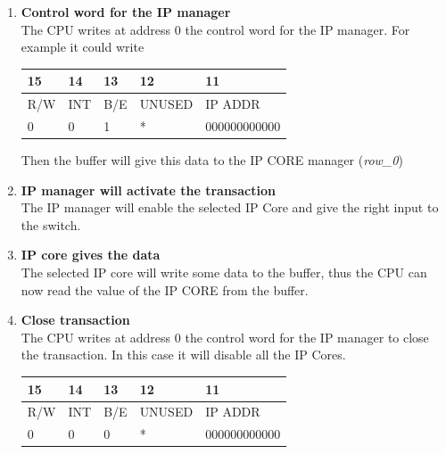 \begin{enumerate}
	\item \textbf{Control word for the IP manager}\\
	 The CPU writes at address 0 the control word for the IP manager.
	 For example it could write
	 
	 \begin{center}
	 	\begin{tabular}{ | l | l |  l | l | l |}
	 		
	 		15 & 14 & 13 & 12 & 11 \qquad \qquad 0 \\ \hline
	 		R/W & INT & B/E & UNUSED & IP ADDR\\ \hline
				0 & 0 & 1 & * & 000000000000\\ \hline	 		
	 		
	 		\hline
	 	\end{tabular}
	 \end{center}
	
	 \bigskip
	 Then the buffer will give this data to the IP CORE manager (\textit{row\_0})
	 
	 \item \textbf{IP manager will activate the transaction}\\
	 The IP manager will enable the selected IP Core and give the right input to the switch.
	 
	 \item \textbf{IP core gives the data}\\
	 The selected IP core will write some data to the buffer, thus the CPU can now read the value of the IP CORE from the buffer.
	 
	 \item \textbf{Close transaction}\\
	 The CPU writes at address 0 the control word for the IP manager to close the transaction.
	 In this case it will disable all the IP Cores.
	 
	 \begin{center}
	 	\begin{tabular}{ | l | l |  l | l | l |}
	 		
	 		15 & 14 & 13 & 12 & 11 \qquad \qquad 0 \\ \hline
	 		R/W & INT & B/E & UNUSED & IP ADDR\\ \hline
	 		0 & 0 & 0 & * & 000000000000\\ \hline	 		
	 		
	 		\hline
	 	\end{tabular}
	 \end{center}
	 
\end{enumerate}
\bigskip
\bigskip

